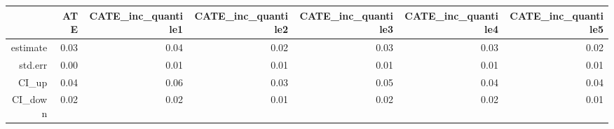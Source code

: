 \begin{table}[ht]
\centering
\begin{tabular}{rrrrrrr}
  \hline
 & ATE & CATE\_inc\_quantile1 & CATE\_inc\_quantile2 & CATE\_inc\_quantile3 & CATE\_inc\_quantile4 & CATE\_inc\_quantile5 \\ 
  \hline
estimate & 0.03 & 0.04 & 0.02 & 0.03 & 0.03 & 0.02 \\ 
  std.err & 0.00 & 0.01 & 0.01 & 0.01 & 0.01 & 0.01 \\ 
  CI\_up & 0.04 & 0.06 & 0.03 & 0.05 & 0.04 & 0.04 \\ 
  CI\_down & 0.02 & 0.02 & 0.01 & 0.02 & 0.02 & 0.01 \\ 
   \hline
\end{tabular}
\end{table}
